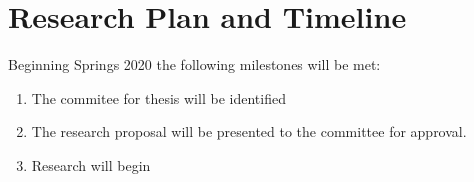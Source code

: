 \documentclass[conference]{IEEEtran}
\begin{document}
\section{Research Plan and Timeline}
Beginning Springs 2020 the following milestones will be met:
\begin{enumerate}
\item The commitee for thesis will be identified
\item The research proposal will be presented to the committee for approval.
\item Research will begin
\end{enumerate}





\end{document}
